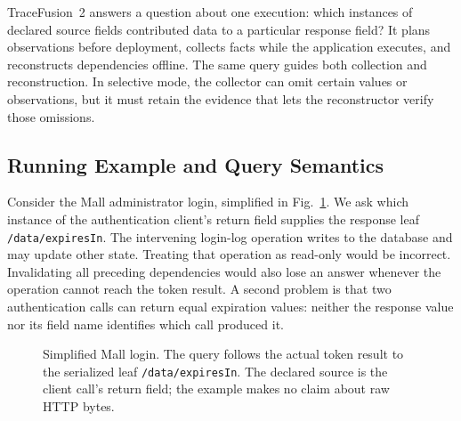 
TraceFusion~2 answers a question about one execution: which instances of
declared source fields contributed data to a particular response field?
It plans observations before deployment, collects facts while the application
executes, and reconstructs dependencies offline. The same query guides both
collection and reconstruction. In selective mode, the collector can omit
certain values or observations, but it must retain the evidence that lets
the reconstructor verify those omissions.

\subsection{Running Example and Query Semantics}
\label{sec:method-query}

Consider the Mall administrator login, simplified in
Fig.~\ref{fig:login-example}. We ask which instance of the authentication
client's return field supplies the response leaf \texttt{/data/expiresIn}.
The intervening login-log operation writes to the database and may update
other state. Treating that operation as read-only would be incorrect.
Invalidating all preceding dependencies would also lose an answer whenever
the operation cannot reach the token result. A second problem is that two
authentication calls can return equal expiration values: neither the
response value nor its field name identifies which call produced it.

\begin{figure}[!ht]
\centering
{}
\caption{Simplified Mall login. The query follows the actual token result to
the serialized leaf \texttt{/data/expiresIn}. The declared source is the
client call's return field; the example makes no claim about raw HTTP bytes.}
\label{fig:login-example}
\end{figure}


